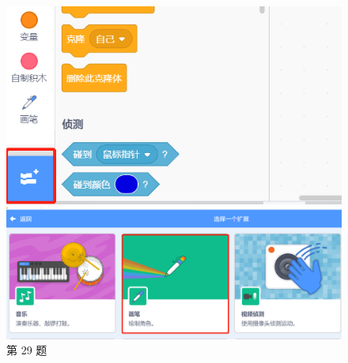\documentclass[10pt, a4paper]{article}
\begin{document}
\begin{enumerate}
        \begin{figure}[htbp]
            \centering
            \begin{minipage}[t]{.6\textwidth}
                \centering
                \begin{minipage}[t]{.4\textwidth}
                    \centering
                    \includegraphics[width=\textwidth]{29-1.png}
                \end{minipage}
                \begin{minipage}[t]{.58\textwidth}
                    \centering
                    \includegraphics[width=\textwidth]{29-2.png}
                \end{minipage}
                \caption*{第 29 题}
            \end{minipage}
            \begin{minipage}[t]{.15\textwidth}
                \centering

\end{minipage}
\end{figure}
\end{enumerate}
\end{document}
